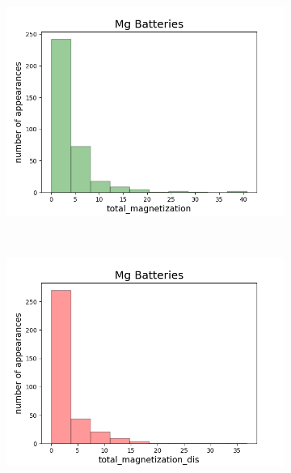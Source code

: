 \begin{figure}[h]
\begin{subfigure}{0.2\textwidth}
     \end{subfigure}
          ~ 
               \begin{subfigure}{0.2\textwidth}
         \centering
         \includegraphics[width=\linewidth]{result/figures/distribution/Mg_distrof_total_magnetization.png}
         
     \end{subfigure}
          ~ 
     \begin{subfigure}{0.2\textwidth}
         \centering
         \includegraphics[width=\linewidth]{result/figures/distribution/Mg_distrof_total_magnetization_dis.png}
         

\end{subfigure}
\end{figure}

